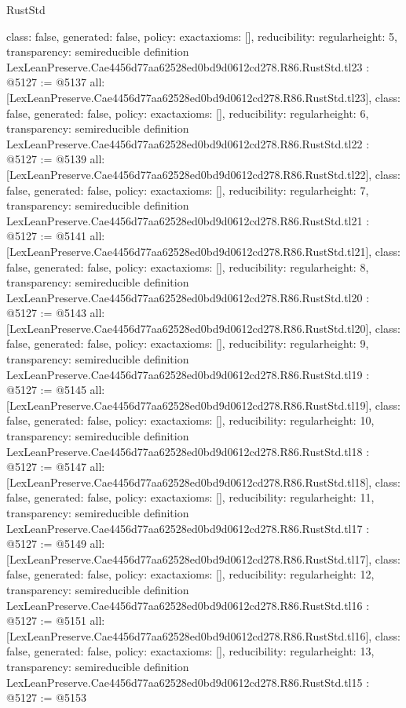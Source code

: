 \begin{lexlean}{RustStd}
\begin{coremodule}
{  class: false,
  generated: false,
  policy: exact{axioms: []},
  reducibility: regular{height: 5},
  transparency: semireducible
}
definition LexLeanPreserve.Cae4456d77aa62528ed0bd9d0612cd278.R86.RustStd.tl23 : @5127 := @5137 {
  all: [LexLeanPreserve.Cae4456d77aa62528ed0bd9d0612cd278.R86.RustStd.tl23],
  class: false,
  generated: false,
  policy: exact{axioms: []},
  reducibility: regular{height: 6},
  transparency: semireducible
}
definition LexLeanPreserve.Cae4456d77aa62528ed0bd9d0612cd278.R86.RustStd.tl22 : @5127 := @5139 {
  all: [LexLeanPreserve.Cae4456d77aa62528ed0bd9d0612cd278.R86.RustStd.tl22],
  class: false,
  generated: false,
  policy: exact{axioms: []},
  reducibility: regular{height: 7},
  transparency: semireducible
}
definition LexLeanPreserve.Cae4456d77aa62528ed0bd9d0612cd278.R86.RustStd.tl21 : @5127 := @5141 {
  all: [LexLeanPreserve.Cae4456d77aa62528ed0bd9d0612cd278.R86.RustStd.tl21],
  class: false,
  generated: false,
  policy: exact{axioms: []},
  reducibility: regular{height: 8},
  transparency: semireducible
}
definition LexLeanPreserve.Cae4456d77aa62528ed0bd9d0612cd278.R86.RustStd.tl20 : @5127 := @5143 {
  all: [LexLeanPreserve.Cae4456d77aa62528ed0bd9d0612cd278.R86.RustStd.tl20],
  class: false,
  generated: false,
  policy: exact{axioms: []},
  reducibility: regular{height: 9},
  transparency: semireducible
}
definition LexLeanPreserve.Cae4456d77aa62528ed0bd9d0612cd278.R86.RustStd.tl19 : @5127 := @5145 {
  all: [LexLeanPreserve.Cae4456d77aa62528ed0bd9d0612cd278.R86.RustStd.tl19],
  class: false,
  generated: false,
  policy: exact{axioms: []},
  reducibility: regular{height: 10},
  transparency: semireducible
}
definition LexLeanPreserve.Cae4456d77aa62528ed0bd9d0612cd278.R86.RustStd.tl18 : @5127 := @5147 {
  all: [LexLeanPreserve.Cae4456d77aa62528ed0bd9d0612cd278.R86.RustStd.tl18],
  class: false,
  generated: false,
  policy: exact{axioms: []},
  reducibility: regular{height: 11},
  transparency: semireducible
}
definition LexLeanPreserve.Cae4456d77aa62528ed0bd9d0612cd278.R86.RustStd.tl17 : @5127 := @5149 {
  all: [LexLeanPreserve.Cae4456d77aa62528ed0bd9d0612cd278.R86.RustStd.tl17],
  class: false,
  generated: false,
  policy: exact{axioms: []},
  reducibility: regular{height: 12},
  transparency: semireducible
}
definition LexLeanPreserve.Cae4456d77aa62528ed0bd9d0612cd278.R86.RustStd.tl16 : @5127 := @5151 {
  all: [LexLeanPreserve.Cae4456d77aa62528ed0bd9d0612cd278.R86.RustStd.tl16],
  class: false,
  generated: false,
  policy: exact{axioms: []},
  reducibility: regular{height: 13},
  transparency: semireducible
}
definition LexLeanPreserve.Cae4456d77aa62528ed0bd9d0612cd278.R86.RustStd.tl15 : @5127 := @5153 {
}
\end{coremodule}
\end{lexlean}
